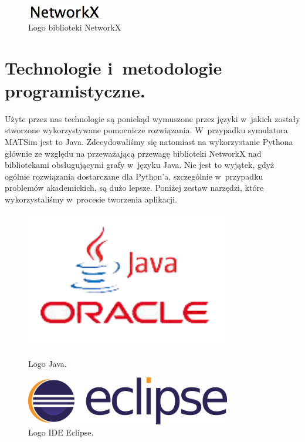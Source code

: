 \documentclass[twoside,12pt]{report}
\begin{document}
\begin{figure}[ht]
\centering
\includegraphics[width=0.30\textwidth]{img/networkx}
\caption{Logo biblioteki NetworkX} 
\end{figure}

\section{Technologie i~metodologie programistyczne.}

Użyte przez nas technologie są poniekąd wymuszone przez języki w~jakich zostały stworzone wykorzystywane pomocnicze rozwiązania. W~przypadku symulatora MATSim jest to Java. Zdecydowaliśmy się natomiast na wykorzystanie Pythona głównie ze względu na przeważającą przewagę biblioteki NetworkX nad bibliotekami obsługującymi grafy w~języku Java. Nie jest to wyjątek, gdyż ogólnie rozwiązania dostarczane dla Python'a, szczególnie w~przypadku problemów akademickich, są dużo lepsze. Poniżej zestaw narzędzi, które wykorzystaliśmy w~procesie tworzenia aplikacji.  

\begin{figure}[h]
\begin{flushleft}
	\begin{minipage}[]{.47\textwidth}
	\centering
	\includegraphics[width=0.8\textwidth]{img/java}
	\caption{Logo Java.}
\end{minipage}%
\end{flushleft}
\begin{flushright}
	\begin{minipage}[]{.47\textwidth}
	\centering
	\includegraphics[width=0.8\textwidth]{img/eclipse}
	\caption{Logo IDE Eclipse.}	
	\end{minipage}
\end{flushright}
\end{figure}
\end{document}
